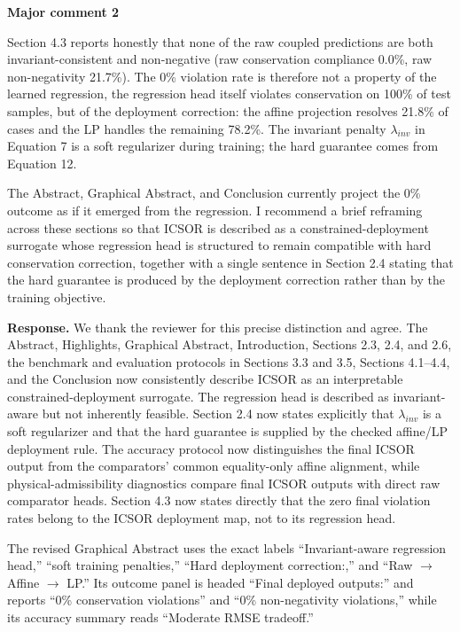 \documentclass[11pt,a4paper]{article}
\begin{document}
\begin{reviewercomment}
\textbf{Major comment 2}

Section 4.3 reports honestly that none of the raw coupled predictions are both invariant-consistent and non-negative (raw conservation compliance 0.0\%, raw non-negativity 21.7\%). The 0\% violation rate is therefore not a property of the learned regression, the regression head itself violates conservation on 100\% of test samples, but of the deployment correction: the affine projection resolves 21.8\% of cases and the LP handles the remaining 78.2\%. The invariant penalty $\lambda_{inv}$ in Equation 7 is a soft regularizer during training; the hard guarantee comes from Equation 12.

The Abstract, Graphical Abstract, and Conclusion currently project the 0\% outcome as if it emerged from the regression. I recommend a brief reframing across these sections so that ICSOR is described as a constrained-deployment surrogate whose regression head is structured to remain compatible with hard conservation correction, together with a single sentence in Section 2.4 stating that the hard guarantee is produced by the deployment correction rather than by the training objective.
\end{reviewercomment}

\noindent\textbf{Response.} We thank the reviewer for this precise distinction and agree. The Abstract, Highlights, Graphical Abstract, Introduction, Sections 2.3, 2.4, and 2.6, the benchmark and evaluation protocols in Sections 3.3 and 3.5, Sections 4.1--4.4, and the Conclusion now consistently describe ICSOR as an interpretable constrained-deployment surrogate. The regression head is described as invariant-aware but not inherently feasible. Section 2.4 now states explicitly that $\lambda_{inv}$ is a soft regularizer and that the hard guarantee is supplied by the checked affine/LP deployment rule. The accuracy protocol now distinguishes the final ICSOR output from the comparators' common equality-only affine alignment, while physical-admissibility diagnostics compare final ICSOR outputs with direct raw comparator heads. Section 4.3 now states directly that the zero final violation rates belong to the ICSOR deployment map, not to its regression head.

The revised Graphical Abstract uses the exact labels ``Invariant-aware regression head,'' ``soft training penalties,'' ``Hard deployment correction:,'' and ``Raw $\rightarrow$ Affine $\rightarrow$ LP.'' Its outcome panel is headed ``Final deployed outputs:'' and reports ``0\% conservation violations'' and ``0\% non-negativity violations,'' while its accuracy summary reads ``Moderate RMSE tradeoff.''
\end{document}
